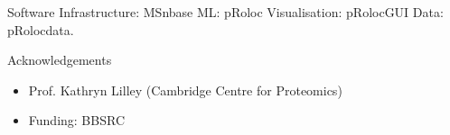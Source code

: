 \documentclass[bigger]{beamer}
\newcommand{\Rpackage}[1]{{\mbox{\normalfont\textsf{#1}}}}
\begin{document}
  \begin{frame}

   \begin{block}{Software}
     \vspace{.1cm}
     Infrastructure: \Rpackage{MSnbase} \newline
     ML: \Rpackage{pRoloc} \newline
     Visualisation: \Rpackage{pRolocGUI} \newline
     Data: \Rpackage{pRolocdata}.
    \vspace{.2cm}
  \end{block}
   
  
  \begin{block}{Acknowledgements}
    \begin{itemize}
    \item Prof. Kathryn Lilley (Cambridge Centre for Proteomics)
    \item Funding: BBSRC
    \end{itemize}
  \end{block}
  
  
  \end{frame}
  
  
\end{document}
